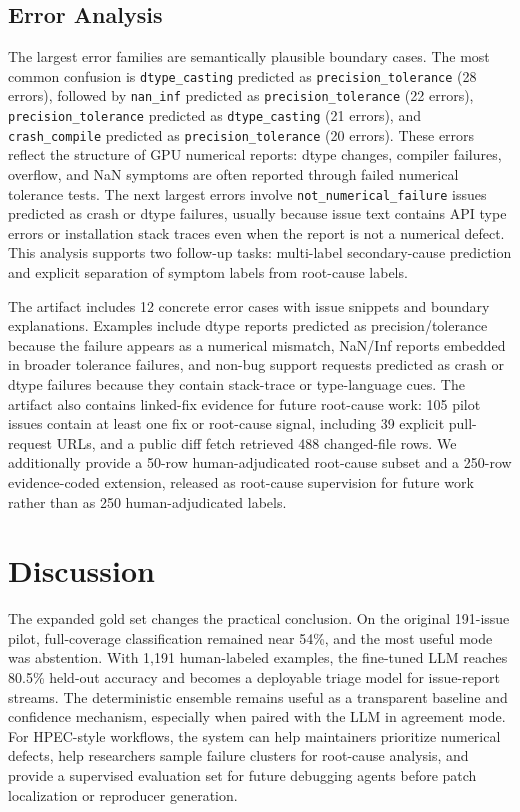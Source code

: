 \documentclass[conference]{IEEEtran}
\begin{document}
\subsection{Error Analysis}

The largest error families are semantically plausible boundary cases. The most
common confusion is \texttt{dtype\_casting} predicted as
\texttt{precision\_tolerance} (28 errors), followed by \texttt{nan\_inf}
predicted as \texttt{precision\_tolerance} (22 errors),
\texttt{precision\_tolerance} predicted as \texttt{dtype\_casting} (21 errors),
and \texttt{crash\_compile} predicted as \texttt{precision\_tolerance} (20
errors). These errors reflect the structure of GPU numerical reports: dtype
changes, compiler failures, overflow, and NaN symptoms are often reported
through failed numerical tolerance tests. The next largest errors involve
\texttt{not\_numerical\_failure} issues predicted as crash or dtype failures,
usually because issue text contains API type errors or installation stack
traces even when the report is not a numerical defect. This analysis supports
two follow-up tasks: multi-label secondary-cause prediction and explicit
separation of symptom labels from root-cause labels.

The artifact includes 12 concrete error cases with issue snippets and boundary
explanations. Examples include dtype reports predicted as precision/tolerance
because the failure appears as a numerical mismatch, NaN/Inf reports embedded
in broader tolerance failures, and non-bug support requests predicted as crash
or dtype failures because they contain stack-trace or type-language cues. The
artifact also contains linked-fix evidence for future root-cause work: 105
pilot issues contain at least one fix or root-cause signal, including 39
explicit pull-request URLs, and a public diff fetch retrieved 488 changed-file
rows. We additionally provide a 50-row human-adjudicated root-cause subset and
a 250-row evidence-coded extension, released as root-cause supervision for
future work rather than as 250 human-adjudicated labels.

\section{Discussion}

The expanded gold set changes the practical conclusion. On the original
191-issue pilot, full-coverage classification remained near 54\%, and the most
useful mode was abstention. With 1,191 human-labeled examples, the fine-tuned
LLM reaches 80.5\% held-out accuracy and becomes a deployable triage model for
issue-report streams. The deterministic ensemble remains useful as a
transparent baseline and confidence mechanism, especially when paired with the
LLM in agreement mode. For HPEC-style workflows, the system can help
maintainers prioritize numerical defects, help researchers sample failure
clusters for root-cause analysis, and provide a supervised evaluation set for
future debugging agents before patch localization or reproducer generation.
\end{document}
